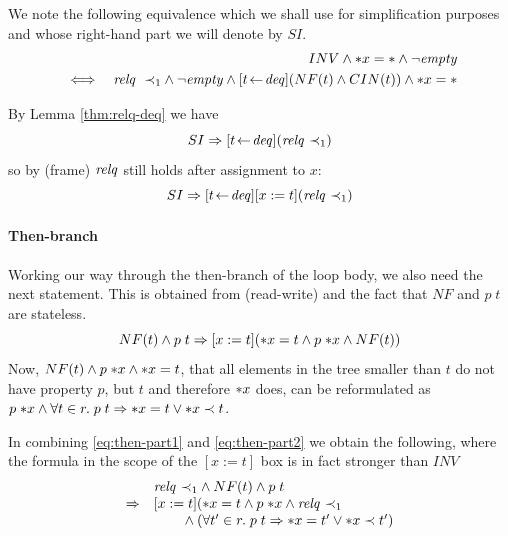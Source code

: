 We note the following equivalence which we shall use for simplification purposes
and whose right-hand part we will denote by $SI$.
\begin{eqnarray}
\label{eq:inv-equiv}
&& INV \land {\ast x} = \ast \land \lnot \mathit{empty} \\
&\iff& {\mathit{relq}~\prec_1} \land \lnot \mathit{empty} \land [t \!\gets\! \mathit{deq}](NF(t) \land CIN(t)) \land {\ast x} = \ast 
\nonumber
\end{eqnarray}

By Lemma \ref{thm:relq-deq} we have
\[
SI \Rightarrow [t \!\gets\! \mathit{deq}](\mathit{relq}~{\prec}_1)
\]
so by (frame) $\mathit{relq}$ still holds after assignment to $x$:
\begin{equation}
\label{eq:then-part1}
SI \Rightarrow [t \!\gets\! \mathit{deq}][x := t](\mathit{relq}~{\prec}_1)
\end{equation}

\paragraph{Then-branch} 
Working our way through the
then-branch of the loop body, we also need the next statement. This is
obtained from (read-write) and the fact that $NF$ and $p\; t$ are stateless.
\begin{equation}
\label{eq:then-part2}
NF(t) \land p\;t \Rightarrow [x := t]({\ast x} = t \land p\;{\ast x} \land NF(t))
\end{equation}
Now, $NF(t) \land p\;{\ast x} \land {\ast x} = t$, \IE that all elements in the tree smaller
than $t$ do not have property $p$, but $t$ and therefore ${\ast x}$ does, can be
reformulated as $p\;{\ast x} \land \forall t\in r.\; p\;t \Rightarrow {\ast x} = t \lor {\ast x} \prec t$. 


In combining
\eqref{eq:then-part1} and \eqref{eq:then-part2} we obtain the following, where
the formula in the scope of the  $[x := t]$ box is in fact stronger than $INV$
\begin{equation}
\label{eq:prem-then}
\begin{array}{l@{\quad}l}
& \relq~{\prec}_1 \land NF(t) \land p\;t \\
 \Rightarrow& 
   [x := t](\rd{x} = t \land p\;\rd{x} \land \relq~{\prec}_1\\
&\qquad {} \land (\forall t'\in r\bnd p\;t\Rightarrow\rd{x} = t' \lor \rd{x} \prec t')
\end{array}
\end{equation}

